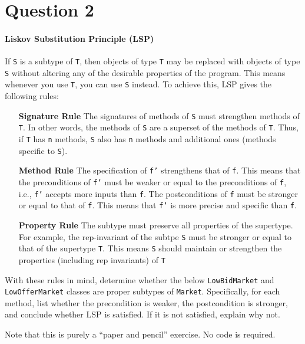 \documentclass[10pt]{article}
\newcommand{\code}[1]{\texttt{#1}}
\begin{document}
\newpage
\section{Question 2}


\paragraph{Liskov Substitution Principle (LSP)} If \code{S} is a subtype of \code{T}, then objects of type \code{T} may be replaced with objects of type \code{S} without altering any of the desirable properties of the program. This means whenever you use \code{T}, you can use \code{S} instead. To achieve this, LSP gives the following rules:

\begin{itemize}
\item[\textbf{Signature Rule}] The signatures of methods of \code{S} must strengthen methods of \code{T}. In other words, the methods of \code{S} are a superset of the methods of \code{T}. Thus, if \code{T} has \code{n} methods, \code{S} also has \code{n} methods and additional ones (methods specific to \code{S}). 

\item[\textbf{Method Rule}] The specification of \code{f'} strengthens that of \code{f}. This means that the preconditions of \code{f'} must be weaker or equal to the preconditions of \code{f}, i.e.,  \code{f'} accepts more inputs than \code{f}.  The postconditions of \code{f} must be stronger or equal to that of \code{f}. This means that \code{f'} is more precise and specific than \code{f}.

\item[\textbf{Property Rule}] The subtype must preserve all properties of the supertype.  For example, the rep-invariant of the subtpe \code{S} must be stronger or equal to that of the supertype \code{T}. This means \code{S} should maintain or strengthen the properties (including rep invariants) of \code{T}
\end{itemize}


With these rules in mind, determine whether the below \code{LowBidMarket} and \code{LowOfferMarket} classes are proper subtypes of \code{Market}. Specifically, for each method, list whether the precondition is weaker, the postcondition is stronger, and conclude whether LSP is satisfied.  If it is not satisfied, explain why not.

Note that this is purely a ``paper and pencil'' exercise. No code is required.
\end{document}
